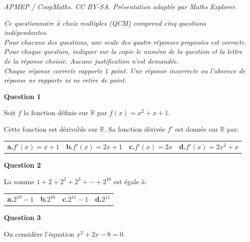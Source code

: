 \documentclass[10pt]{article}
\providecommand{\R}{\mathbb{R}}
\begin{document}
\noindent\textit{APMEP / CoopMaths. CC BY-SA. Présentation adaptée par Maths Explorer.}\par\medskip
\bigskip

\emph{Ce questionnaire à choix multiples (QCM) comprend cinq questions indépendantes.\\
Pour chacune des questions, une seule des quatre réponses proposées est correcte.\\
Pour chaque question, indiquer sur la copie le numéro de la question et la lettre de la réponse choisie. Aucune justification n’est demandée.\\
Chaque réponse correcte rapporte $1$ point. Une réponse incorrecte ou l'absence de réponse ne rapporte ni ne retire de point.}

\bigskip

\textbf{Question 1}

\medskip

Soit $f$ la fonction définie sur $\R$ par $f(x) = x^2+x+1$.

Cette fonction est dérivable sur $\R$. Sa fonction dérivée $f'$ est donnée sur $\R$ par:

\begin{center}
{\renewcommand{\arraystretch}{1.5}
\begin{tabularx}{\linewidth}{XXXX}
\textbf{a.}\quad $f'(x)=x+1$ & \textbf{b.}\quad $f'(x)=2x+1$ 
& \textbf{c.}\quad $f'(x)=2x$   & \textbf{d.}\quad $f'(x)=2x^2+x$\\
\end{tabularx}}
\end{center}

\medskip

\textbf{Question 2}

\medskip

La somme $1+2+2^2 + 2^3 + \cdots + 2^{10}$ est égale à:

\begin{center}
{\renewcommand{\arraystretch}{1.5}
\begin{tabularx}{0.9\linewidth}{XXXX}
\textbf{a.}\quad $2^{10}-1$ & \textbf{b.}\quad $2^{10}$ 
& \textbf{c.}\quad $2^{11}-1$   & \textbf{d.}\quad $2^{11}$\\
\end{tabularx}}
\end{center}

\medskip

\textbf{Question 3}

\medskip

On considère l'équation $x^2+2x-8=0$.
\end{document}
